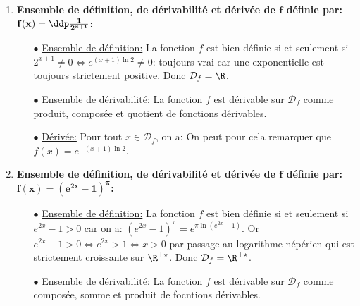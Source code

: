 \begin{correction}
\begin{enumerate}
\begin{itemize}
\item[$\bullet$] \underline{Ensemble de d\'efinition:} La fonction $f$ est bien d\'efinie si et seulement si $\cos^4{(x)}\not= 0 \Leftrightarrow \cos{x}\not= 0$. Donc $\mathcal{D}_f=\R\setminus\left\lbrace \ddp\frac{\pi}{2}+k\pi,\ k\in\Z   \right\rbrace$.
\item[$\bullet$] \underline{Ensemble de d\'erivabilit\'e:} La fonction $f$ est d\'erivable sur $\mathcal{D}_f$ comme compos\'ee et quotient de fonctions d\'erivables.
\item[$\bullet$] \underline{D\'eriv\'ee:} Pour tout $x\in\mathcal{D}_f$, on a: 
 \end{itemize}
 \item  \textbf{Ensemble de d\'efinition, de d\'erivabilit\'e et d\'eriv\'ee de $\mathbf{f}$ d\'efinie par: $\mathbf{f(x)=\ddp\frac{1}{2^{x+1}}}$:}
\begin{itemize}
\item[$\bullet$] \underline{Ensemble de d\'efinition:} La fonction $f$ est bien d\'efinie si et seulement si $2^{x+1}\not= 0\Leftrightarrow e^{(x+1)\ln{2}}\not= 0$: toujours vrai car une exponentielle est toujours strictement positive. Donc $\mathcal{D}_f=\R$.
\item[$\bullet$] \underline{Ensemble de d\'erivabilit\'e:} La fonction $f$ est d\'erivable sur $\mathcal{D}_f$ comme produit, compos\'ee et quotient de fonctions d\'erivables.
\item[$\bullet$] \underline{D\'eriv\'ee:} Pour tout $x\in\mathcal{D}_f$, on a:  On peut pour cela remarquer que $f(x)=e^{-(x+1)\ln{2}}$.
 \end{itemize}
\item  \textbf{Ensemble de d\'efinition, de d\'erivabilit\'e et d\'eriv\'ee de $\mathbf{f}$ d\'efinie par: $\mathbf{f(x)=(e^{2x}-1)^{\pi}}$:}
\begin{itemize}
\item[$\bullet$] \underline{Ensemble de d\'efinition:} La fonction $f$ est bien d\'efinie si et seulement si $e^{2x}-1>0$ car on a: $(e^{2x}-1)^{\pi}=e^{\pi\ln{(e^{2x}-1)}}$. Or $e^{2x}-1>0\Leftrightarrow e^{2x}>1  \Leftrightarrow x>0$ par passage au logarithme n\'ep\'erien qui est strictement croissante sur $\R^{+\star}$. Donc $\mathcal{D}_f=\R^{+\star}$.
\item[$\bullet$] \underline{Ensemble de d\'erivabilit\'e:} La fonction $f$ est d\'erivable sur $\mathcal{D}_f$ comme compos\'ee, somme et produit de focntions d\'erivables.

\end{itemize}
\end{enumerate}
\end{correction}
